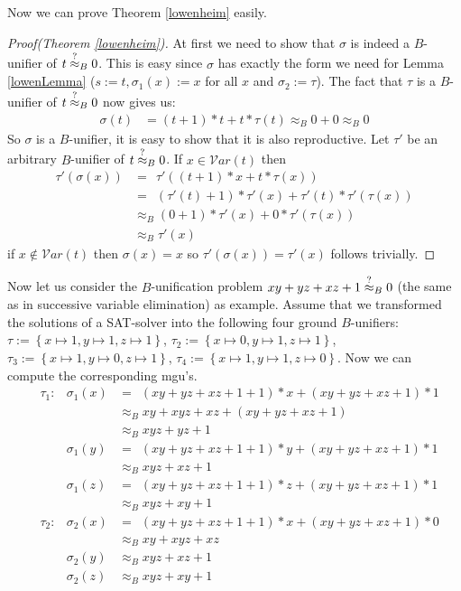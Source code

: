 	Now we can prove Theorem \ref{lowenheim} easily.
	\begin{proof}[Proof(Theorem \ref{lowenheim})]
		At first we need to show that $\sigma$ is indeed a $B$-unifier of $t\stackrel{?}{\approx}_B0$. This is easy since $\sigma$ has exactly the form we need for Lemma \ref{lowenLemma} ($s:=t,\sigma_1(x):=x$ for all $x$ and $\sigma_2:=\tau$). The fact that $\tau$ is a $B$-unifier of $t\stackrel{?}{\approx}_B0$ now gives us:
		\begin{align*}
			\sigma(t) & =(t+1)*t+t*\tau(t) 
			\approx_B0+0
			\approx_B0
		\end{align*}
		So $\sigma$ is a $B$-unifier, it is easy to show that it is also reproductive. Let $\tau'$ be an arbitrary $B$-unifier of $t\stackrel{?}{\approx}_B0$. If $x\in\mathcal{V}ar(t)$ then
		\begin{align*}
			\tau'(\sigma(x)) & =\ \ \tau'((t+1)*x+t*\tau(x))                      \\
			                 & =\ \ (\tau'(t)+1)*\tau'(x)+\tau'(t)*\tau'(\tau(x)) \\
			                 & \approx_B(0+1)*\tau'(x)+0*\tau'(\tau(x))           \\
			                 & \approx_B\tau'(x)                                  
		\end{align*}
		if $x\notin\mathcal{V}ar(t)$ then $\sigma(x)=x$ so $\tau'(\sigma(x))=\tau'(x)$ follows trivially.
	\end{proof}
	Now let us consider the $B$-unification problem $xy+yz+xz+1\stackrel{?}{\approx}_B0$ (the same as in successive variable elimination) as example. Assume that we transformed the solutions of a SAT-solver into the following four ground $B$-unifiers: $\tau:=\left\lbrace x\mapsto1,y\mapsto1,z\mapsto1\right\rbrace$, $\tau_2:=\left\lbrace x\mapsto0,y\mapsto1,z\mapsto1\right\rbrace$, $\tau_3:=\left\lbrace x\mapsto1,y\mapsto0,z\mapsto1\right\rbrace$, $\tau_4:=\left\lbrace x\mapsto1,y\mapsto1,z\mapsto0\right\rbrace$. Now we can compute the corresponding mgu's.
	\begin{align*}
		  & \tau_1: & \sigma_1(x) & =\ \ (xy+yz+xz+1+1)*x+(xy+yz+xz+1)*1 \\
		  &         &             & \approx_Bxy+xyz+xz+(xy+yz+xz+1)      \\
		  &         &             & \approx_Bxyz+yz+1                    \\
		  &         & \sigma_1(y) & =\ \ (xy+yz+xz+1+1)*y+(xy+yz+xz+1)*1 \\
		  &         &             & \approx_Bxyz+xz+1                    \\
		  &         & \sigma_1(z) & =\ \ (xy+yz+xz+1+1)*z+(xy+yz+xz+1)*1 \\
		  &         &             & \approx_Bxyz+xy+1                    \\
		  & \tau_2: & \sigma_2(x) & =\ \ (xy+yz+xz+1+1)*x+(xy+yz+xz+1)*0 \\
		  &         &             & \approx_Bxy+xyz+xz                   \\
		  &         & \sigma_2(y) & \approx_Bxyz+xz+1                    \\
		  &         & \sigma_2(z) & \approx_Bxyz+xy+1                    
	\end{align*}
